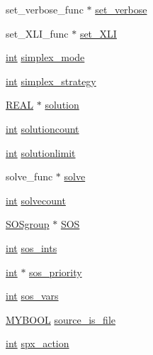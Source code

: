 \begin{DoxyCompactItemize}
\item 
set\+\_\+verbose\+\_\+func $\ast$ \hyperlink{struct__lprec_a815fa7e4c48989a3995473cfbe56b697}{set\+\_\+verbose}
\item 
set\+\_\+\+X\+L\+I\+\_\+func $\ast$ \hyperlink{struct__lprec_a4fca312376713f3e9139fd99d3281ad2}{set\+\_\+\+X\+LI}
\item 
\hyperlink{lp__lib_8h_adeb9ec6400320e4923ac9d836d509ddb}{int} \hyperlink{struct__lprec_ab9863b7d00c6d8946788db4b318ee070}{simplex\+\_\+mode}
\item 
\hyperlink{lp__lib_8h_adeb9ec6400320e4923ac9d836d509ddb}{int} \hyperlink{struct__lprec_a84a3bfcacf0e6286d031100f7ace58da}{simplex\+\_\+strategy}
\item 
\hyperlink{lp__lib_8h_a92bd5e363d131fa73669358edb232dce}{R\+E\+AL} $\ast$ \hyperlink{struct__lprec_a9faeb28b7a309c8cd87da65a49ddd1a2}{solution}
\item 
\hyperlink{lp__lib_8h_adeb9ec6400320e4923ac9d836d509ddb}{int} \hyperlink{struct__lprec_a725ba19eff620bba7f487a69165759c6}{solutioncount}
\item 
\hyperlink{lp__lib_8h_adeb9ec6400320e4923ac9d836d509ddb}{int} \hyperlink{struct__lprec_a1053031695d5f53ebadaf14569dc77e3}{solutionlimit}
\item 
solve\+\_\+func $\ast$ \hyperlink{struct__lprec_ad46496fd3a0dc3f752b6e515e230ba07}{solve}
\item 
\hyperlink{lp__lib_8h_adeb9ec6400320e4923ac9d836d509ddb}{int} \hyperlink{struct__lprec_a570f9d7e9c9bc96a7d22d252a659e2f5}{solvecount}
\item 
\hyperlink{lp___s_o_s_8h_a77017c95c4c26fbb24166d827204ef4b}{S\+O\+Sgroup} $\ast$ \hyperlink{struct__lprec_a9a3521201bcf6ea2759501c65627c8a8}{S\+OS}
\item 
\hyperlink{lp__lib_8h_adeb9ec6400320e4923ac9d836d509ddb}{int} \hyperlink{struct__lprec_a5fcbab3860d1feb60d0c77a0121edf66}{sos\+\_\+ints}
\item 
\hyperlink{lp__lib_8h_adeb9ec6400320e4923ac9d836d509ddb}{int} $\ast$ \hyperlink{struct__lprec_a83363a08af5112f6b7c3f6b757362bac}{sos\+\_\+priority}
\item 
\hyperlink{lp__lib_8h_adeb9ec6400320e4923ac9d836d509ddb}{int} \hyperlink{struct__lprec_aa14cbc246140ec51704d27f5d89e228f}{sos\+\_\+vars}
\item 
\hyperlink{lp__lib_8h_aad848328fb3018217ac9f01d97b6bd88}{M\+Y\+B\+O\+OL} \hyperlink{struct__lprec_a2263cf9ee4b340821300f841e34e9e0b}{source\+\_\+is\+\_\+file}
\item 
\hyperlink{lp__lib_8h_adeb9ec6400320e4923ac9d836d509ddb}{int} \hyperlink{struct__lprec_ac4b2204647dd9197658f2c1f77503907}{spx\+\_\+action}

\end{DoxyCompactItemize}
